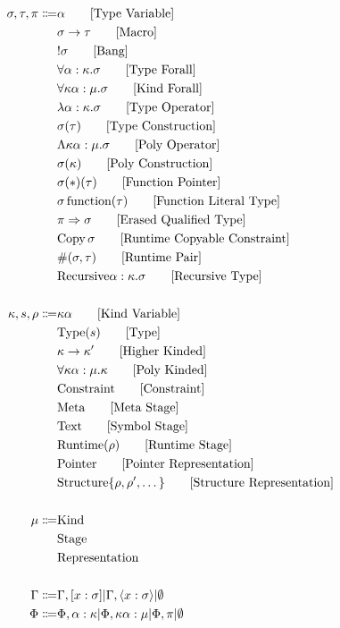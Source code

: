 \documentclass {article}
\begin{document}
\begin{align*}
\sigma, \tau, \pi \Coloneqq & \alpha \tag* {[Type Variable]}\\
& \sigma \to \tau \tag*{[Macro]}\\
& !\sigma \tag*{[Bang]} \\
& \forall \alpha : \kappa. \sigma \tag*{[Type Forall]}\\ 
& \forall \kappa \alpha : \mu. \sigma \tag*{[Kind Forall]}\\
& \lambda \alpha : \kappa. \sigma \tag*{[Type Operator]} \\
& \sigma (\tau) \tag*{[Type Construction]} \\
& \Lambda \kappa \alpha : \mu. \sigma \tag*{[Poly Operator]} \\
& \sigma (\kappa) \tag*{[Poly Construction]} \\
& \sigma (*) (\tau) \tag*{[Function Pointer]}\\
& \sigma \, \text{function}(\tau) \tag*{[Function Literal Type]} \\
& \pi \Rightarrow \sigma \tag*{[Erased Qualified Type]} \\
& \text{Copy} \, \sigma \tag*{[Runtime Copyable Constraint]} \\
& \#(\sigma, \tau) \tag*{[Runtime Pair]} \\
& \text{Recursive} \alpha : \kappa. \sigma \tag*{[Recursive Type]} \\
\\
\kappa, s, \rho \Coloneqq &  \kappa \alpha \tag*{[Kind Variable]} \\
& \text{Type} (s) \tag*{[Type]} \\
& \kappa \to \kappa' \tag*{[Higher Kinded]} \\
& \forall \kappa \alpha : \mu. \kappa \tag*{[Poly Kinded]}\\
& \text{Constraint} \tag*{[Constraint]} \\
& \text{Meta} \tag*{[Meta Stage]}\\
& \text{Text} \tag*{[Symbol Stage]} \\
& \text{Runtime} (\rho) \tag*{[Runtime Stage]}\\
& \text{Pointer} \tag*{[Pointer Representation]}\\
& \text{Structure} \{ \rho, \rho', \dots \} \tag*{[Structure Representation]} \\
\\
\mu \Coloneqq & \text{Kind} \\
& \text{Stage} \\
& \text{Representation} \\
\\
\Gamma \Coloneqq & \Gamma, [x : \sigma] | \Gamma, \langle x : \sigma \rangle | \emptyset \\
\Phi \Coloneqq & \Phi, \alpha : \kappa | \Phi, \kappa \alpha : \mu | \Phi, \pi|  \emptyset \\
\end{align*}
\end{document}
